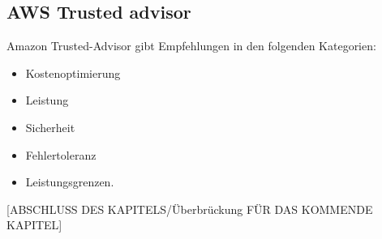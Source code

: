 \subsection{AWS Trusted advisor}

Amazon Trusted-Advisor gibt Empfehlungen in den folgenden Kategorien:
\begin{itemize}
      \item
            Kostenoptimierung

      \item
            Leistung
      \item
            Sicherheit
      \item
            Fehlertoleranz
      \item
            Leistungsgrenzen.
\end{itemize}\textbf{}

[ABSCHLUSS DES KAPITELS/Überbrückung FÜR DAS KOMMENDE KAPITEL]

